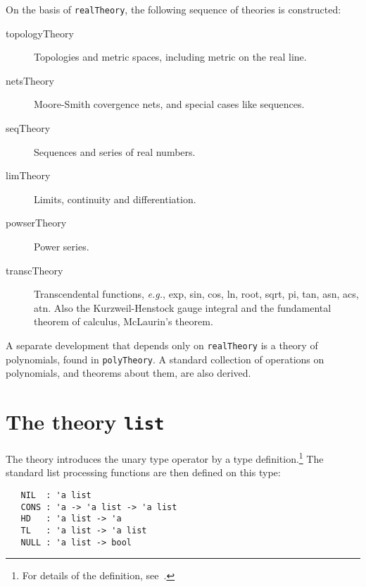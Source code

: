 {On the basis of {\small\verb+realTheory+}, the following  sequence of
theories is constructed:

\begin{description}
\item [topologyTheory] Topologies and metric spaces, including metric on
the real line.
\item [netsTheory] Moore-Smith covergence nets, and special cases like
sequences.
\item [seqTheory] Sequences and series of real numbers.
\item [limTheory] Limits, continuity and differentiation.
\item [powserTheory] Power series.
\item [transcTheory] Transcendental functions, \emph{e.g.}, exp, sin,
cos, ln, root, sqrt, pi, tan, asn, acs, atn. Also the Kurzweil-Henstock
gauge integral and the fundamental theorem of calculus, McLaurin's
theorem.

\end{description}

A separate development that depends only on {\small\verb+realTheory+} is
a theory of polynomials, found in {\small\verb+polyTheory+}. A standard
collection of operations on polynomials, and theorems about them, are
also derived.

\section{The theory {\tt list}}\label{avra_list}

The theory  introduces the unary type operator  by a type
definition.\footnote{For details of the definition,
see~\cite{HOL-paper,Melham-banff}.}  The standard list processing functions
are then defined on this type:

\begin{hol}
\begin{verbatim}
   NIL  : 'a list
   CONS : 'a -> 'a list -> 'a list
   HD   : 'a list -> 'a
   TL   : 'a list -> 'a list
   NULL : 'a list -> bool
\end{verbatim}\end{hol}

}
